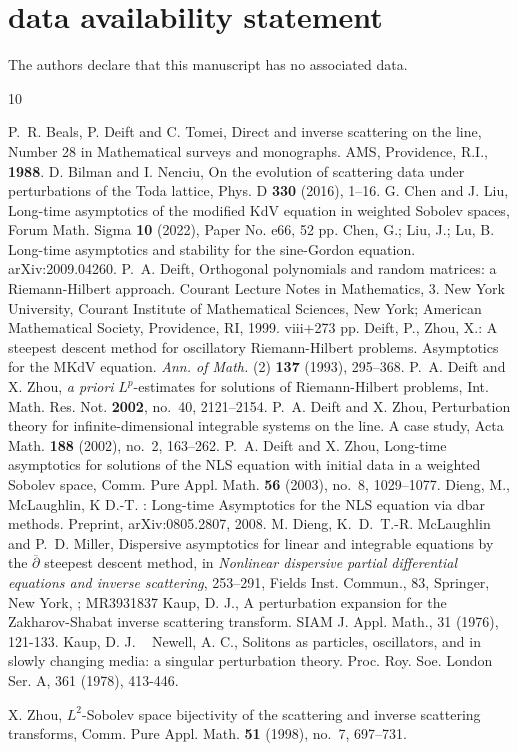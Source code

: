 \documentclass{amsart}
\theoremstyle{plain}
\theoremstyle{remark}
\numberwithin{equation}{section}
\begin{document}
\section*{data availability statement}
The authors declare that this manuscript has no associated data.

\begin{thebibliography}{10}


P.~R. Beals, P. Deift and C. Tomei, Direct and inverse scattering on the line, Number 28 in Mathematical surveys and monographs. AMS, Providence, R.I., {\bf 1988}.
D. Bilman and I. Nenciu, On the evolution of scattering data under perturbations of the Toda lattice, Phys. D {\bf 330} (2016), 1--16.
 G. Chen and J. Liu, Long-time asymptotics of the modified KdV equation in weighted Sobolev spaces, Forum Math. Sigma {\bf 10} (2022), Paper No. e66, 52 pp.
Chen, G.; Liu, J.; Lu, B. Long-time asymptotics and stability for the sine-Gordon equation. arXiv:2009.04260.
P.~A. Deift,  Orthogonal polynomials and random matrices: a Riemann-Hilbert approach. Courant Lecture
Notes in Mathematics, 3. New York University, Courant Institute of Mathematical Sciences, New York;
American Mathematical Society, Providence, RI, 1999. viii+273 pp.
Deift, P.,  Zhou, X.: A steepest descent method for oscillatory Riemann-Hilbert problems. Asymptotics for the MKdV equation. \emph{Ann. of Math.} (2) \textbf{137} (1993), 295--368. 
P.~A. Deift and X. Zhou, \textit{a priori} $L^p$-estimates for solutions of Riemann-Hilbert problems, Int. Math. Res. Not. {\bf 2002}, no.~40, 2121--2154.
 P.~A. Deift and X. Zhou, Perturbation theory for infinite-dimensional integrable systems on the line. A case study, Acta Math. {\bf 188} (2002), no.~2, 163--262.
 P.~A. Deift and X. Zhou, Long-time asymptotics for solutions of the NLS equation with initial data in a weighted Sobolev space, Comm. Pure Appl. Math. {\bf 56} (2003), no.~8, 1029--1077.
Dieng, M., McLaughlin, K D.-T. : Long-time Asymptotics for the NLS equation via dbar methods. Preprint,
 arXiv:0805.2807, 2008.
 M. Dieng, K.~D.~T.-R. McLaughlin and P.~D. Miller, Dispersive asymptotics for linear and integrable equations by the $\overline{\partial}$ steepest descent method, in {\it Nonlinear dispersive partial differential equations and inverse scattering}, 253--291, Fields Inst. Commun., 83, Springer, New York, ; MR3931837
 Kaup, D. J., A perturbation expansion for the Zakharov-Shabat inverse scattering 
transform. SIAM J. Appl. Math., 31 (1976), 121-133.
Kaup, D. J. ~ Newell, A. C., Solitons as particles, oscillators, and in slowly changing media: a singular perturbation theory. Proc. Roy. Soe. London Ser. A, 361 
(1978), 413-446. 

X. Zhou, $L^2$-Sobolev space bijectivity of the scattering and inverse scattering transforms, Comm. Pure Appl. Math. {\bf 51} (1998), no.~7, 697--731.
\end{thebibliography}
\end{document}

